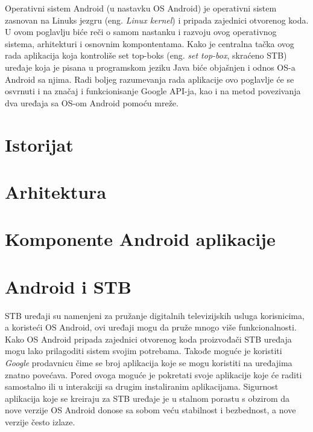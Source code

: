 \documentclass[../TamaraIvanovicMasterRad.tex]{subfiles}
\begin{document}
Operativni sistem Android (u nastavku OS Android) je operativni sistem zasnovan na Linuks jezgru (eng. \textit{Linux kernel}) i pripada zajednici otvorenog koda. U ovom poglavlju biće reči o samom nastanku i razvoju ovog operativnog sistema, arhitekturi i osnovnim kompontentama. Kako je centralna tačka ovog rada aplikacija koja kontroliše set top-boks (eng. \textit{set top-box}, skraćeno STB) uređaje koja je pisana u programskom jeziku Java biće objašnjen i odnos OS-a Android sa njima. Radi boljeg razumevanja rada aplikacije ovo poglavlje će se osvrnuti i na značaj i funkcionisanje Google API-ja, kao i na metod povezivanja dva uređaja sa OS-om Android pomoću mreže. 
\section{Istorijat}



\section{Arhitektura}



\section{Komponente Android aplikacije}


\section{Android i STB}
STB uređaji su namenjeni za pružanje digitalnih televizijskih usluga korisnicima, a koristeći OS Android, ovi uređaji mogu da pruže mnogo više funkcionalnosti. Kako OS Android pripada zajednici otvorenog koda proizvođači STB uređaja mogu lako prilagoditi sistem svojim potrebama. Takođe moguće je koristiti \textit{Google} prodavnicu čime se broj aplikacija koje se mogu koristiti na uređajima znatno povećava. Pored ovoga moguće je pokretati svoje aplikacije koje će raditi samostalno ili u interakciji sa drugim instaliranim aplikacijama. Sigurnost aplikacija koje se kreiraju za STB uređaje je u stalnom porastu s obzirom da nove verzije OS Android donose sa sobom veću stabilnost i bezbednost, a nove verzije često izlaze. 
\end{document}
